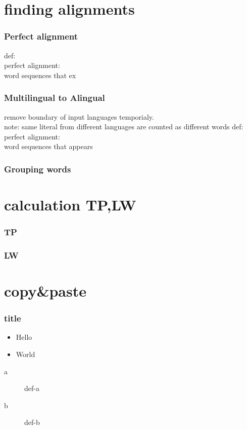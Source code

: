\section{finding alignments}{

  \begin{frame}
    \frametitle{Perfect alignment}
    def:
    \\
    perfect alignment:
    \\
    word sequences that ex
  \end{frame}

  \begin{frame}
    \frametitle{Multilingual to Alingual}
    remove boundary of input languages temporialy.
    \\
    note: same literal from different languages are counted as different words
    def:
    perfect alignment:
    \\
    word sequences that appears
  \end{frame}

  \begin{frame}
    \frametitle{Grouping words}
  \end{frame}
}

\section{calculation TP,LW}{

  \begin{frame}
    \frametitle{TP}
  \end{frame}

  \begin{frame}
    \frametitle{LW}
  \end{frame}
}

\section{copy&paste}{
  \begin{frame}
    \frametitle{title}
    \begin{itemize}
      \item Hello
      \item World
    \end{itemize}
    \begin{description}
      \item[a] def-a
      \item[b] def-b
    \end{description}
  \end{frame}
}



